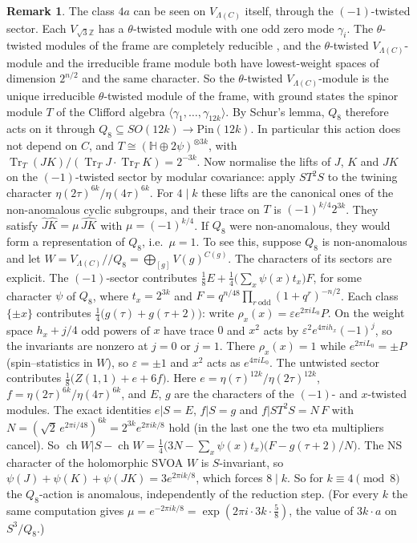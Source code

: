 \documentclass[11pt]{amsart}
\theoremstyle{definition}
\newtheorem{remark}[theorem]{Remark}
\begin{document}
\begin{remark}
The class $4a$ can be seen on $V_{\Lambda(C)}$ itself, through the $(-1)$-twisted sector. Each $V_{\sqrt3\mathbb Z}$ has
a $\theta$-twisted module with one odd zero mode $\gamma_i$. The $\theta$-twisted modules of the frame are completely
reducible \cite[Thm.~4.2]{BK}, and the $\theta$-twisted $V_{\Lambda(C)}$-module and the irreducible frame module both have
lowest-weight spaces of dimension $2^{n/2}$ and the same character. So the $\theta$-twisted $V_{\Lambda(C)}$-module is the
unique irreducible $\theta$-twisted module of the frame, with ground states the spinor
module $T$ of the Clifford algebra $\langle\gamma_1,\dots,\gamma_{12k}\rangle$. By Schur's lemma, $Q_8$ therefore acts on
it through $Q_8\subseteq SO(12k)\to\mathrm{Pin}(12k)$. In particular this action does not depend on $C$, and
$T\cong(\mathbb H\oplus2\psi)^{\otimes3k}$, with $\operatorname{Tr}_T(JK)/(\operatorname{Tr}_TJ\cdot\operatorname{Tr}_TK)=2^{-3k}$.
Now normalise the lifts of $J$, $K$ and $JK$ on the $(-1)$-twisted sector by modular covariance: apply
$ST^2S$ to the twining character $\eta(2\tau)^{6k}/\eta(4\tau)^{6k}$. For $4\mid k$ these lifts are the canonical
ones of the non-anomalous cyclic subgroups, and their trace on $T$ is $(-1)^{k/4}2^{3k}$. They satisfy
$\hat J\hat K=\mu\,\widehat{JK}$ with $\mu=(-1)^{k/4}$. If $Q_8$ were non-anomalous, they would form a
representation of $Q_8$, i.e.\ $\mu=1$. To see this, suppose $Q_8$ is non-anomalous and let
$W=V_{\Lambda(C)}/\!\!/Q_8=\bigoplus_{[g]}V(g)^{C(g)}$. The characters of its sectors are explicit. The
$(-1)$-sector contributes $\tfrac18E+\tfrac14\bigl(\sum_x\psi(x)t_x\bigr)F$, for some character $\psi$ of $Q_8$, where
$t_x=2^{3k}$ and $F=q^{n/48}\prod_{r\ \mathrm{odd}}(1+q^r)^{-n/2}$. Each class $\{\pm x\}$ contributes
$\tfrac14\bigl(g(\tau)+g(\tau+2)\bigr)$: write $\rho_x(x)=\varepsilon e^{2\pi iL_0}P$. On the weight space $h_x+j/4$ odd
powers of $x$ have trace $0$ and $x^2$ acts by $\varepsilon^2e^{4\pi ih_x}(-1)^j$, so the invariants are nonzero at $j=0$
or $j=1$. There $\rho_x(x)=1$ while $e^{2\pi iL_0}=\pm P$ (spin--statistics in $W$), so $\varepsilon=\pm1$ and $x^2$ acts
as $e^{4\pi iL_0}$. The untwisted sector contributes $\tfrac18\bigl(Z(1,1)+e+6f\bigr)$. Here $e=\eta(\tau)^{12k}/\eta(2\tau)^{12k}$,
$f=\eta(2\tau)^{6k}/\eta(4\tau)^{6k}$, and $E$, $g$ are the characters of the $(-1)$- and $x$-twisted modules. The
exact identities $e|S=E$, $f|S=g$ and $f|ST^2S=N\,F$ with $N=(\sqrt2\,e^{2\pi i/48})^{6k}=2^{3k}e^{2\pi ik/8}$ hold (in
the last one the two eta multipliers cancel). So $\operatorname{ch}W|S-\operatorname{ch}W=\tfrac14\bigl(3N-\sum_x\psi(x)t_x\bigr)
\bigl(F-g(\tau+2)/N\bigr)$. The NS character of the holomorphic SVOA $W$ is $S$-invariant, so
$\psi(J)+\psi(K)+\psi(JK)=3e^{2\pi ik/8}$, which forces $8\mid k$. So for $k\equiv4\pmod8$ the $Q_8$-action is anomalous,
independently of the reduction step.
(For every $k$ the same computation gives $\mu=e^{-2\pi ik/8}=\exp(2\pi i\cdot3k\cdot\tfrac58)$, the value of $3k\cdot a$
on $S^3/Q_8$.)


\end{remark}
\end{document}
